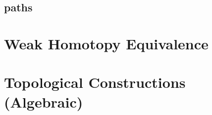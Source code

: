 \documentclass[paper=a4, fontsize=11pt]{scrartcl} %
\numberwithin{equation}{section} %
\numberwithin{figure}{section} %
\numberwithin{table}{section} %
\theoremstyle{definition}
\theoremstyle{remark}
\begin{document}
\subsection{paths}
\label{paths}

\section{Weak Homotopy Equivalence}

\section{Topological Constructions (Algebraic)}
\end{document}

